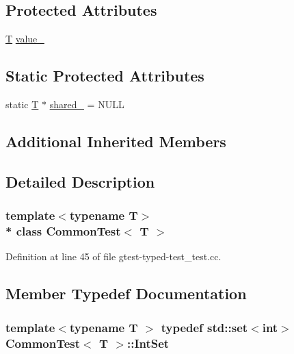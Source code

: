 \subsection*{Protected Attributes}
\begin{DoxyCompactItemize}
\item 
\hyperlink{functions__7_8js_adf1f3edb9115acb0a1e04209b7a9937b}{T} \hyperlink{class_common_test_ae59c4abcb833625a7baeb2048531ebec}{value\+\_\+}
\end{DoxyCompactItemize}
\subsection*{Static Protected Attributes}
\begin{DoxyCompactItemize}
\item 
static \hyperlink{functions__7_8js_adf1f3edb9115acb0a1e04209b7a9937b}{T} $\ast$ \hyperlink{class_common_test_a52368ce1e65a865db9bdccbcc2cedaac}{shared\+\_\+} = N\+U\+LL
\end{DoxyCompactItemize}
\subsection*{Additional Inherited Members}


\subsection{Detailed Description}
\subsubsection*{template$<$typename T$>$\\*
class Common\+Test$<$ T $>$}



Definition at line 45 of file gtest-\/typed-\/test\+\_\+test.\+cc.



\subsection{Member Typedef Documentation}
\subsubsection[{\texorpdfstring{Int\+Set}{IntSet}}]{\setlength{\rightskip}{0pt plus 5cm}template$<$typename T $>$ typedef std\+::set$<$int$>$ {\bf Common\+Test}$<$ {\bf T} $>$\+::{\bf Int\+Set}\hspace{0.3cm}{\ttfamily [protected]}}\hypertarget{class_common_test_a62827e9d3064cddf4a8698747f1bd434}{}\label{class_common_test_a62827e9d3064cddf4a8698747f1bd434}



